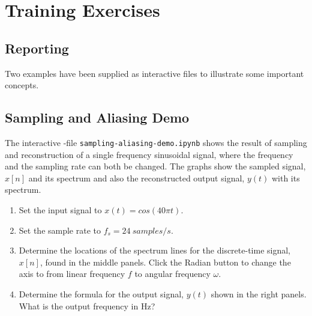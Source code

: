 \section{Training Exercises}

\subsection*{Reporting}



Two examples  have been supplied as interactive \jupyterlab files to illustrate some important concepts.

\subsection{Sampling and Aliasing Demo}
The interactive \jupyterlab-file \verb|sampling-aliasing-demo.ipynb| shows the result of sampling and reconstruction of a single frequency sinusoidal signal, where the frequency and the sampling rate can both be changed. The graphs show the sampled signal, $x[n]$ and its spectrum and also the reconstructed output signal, $y(t)$ with its spectrum.

\begin{enumerate}[1)]
	\item Set the input signal to $x(t)= cos (40 \pi t)$.
	\item Set the sample rate to $f_s=\qty{24}{samples/s}$.
	\item Determine the locations of the spectrum lines for the discrete-time signal, $x[n]$, found in the middle
	panels. Click the Radian button to change the axis to from linear frequency $f$ to angular frequency $\omega$.
	\item Determine the formula for the output signal, $y(t)$ shown in the right panels. What is the output
	frequency in Hz?
\end{enumerate}	
	
